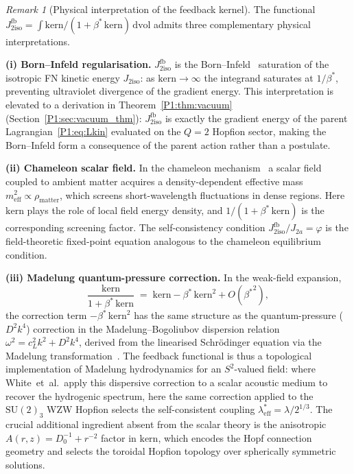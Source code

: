 \documentclass[11pt,a4paper]{article}
\theoremstyle{definition}
\theoremstyle{remark}
\newtheorem{remark}[theorem]{Remark}
\newcommand{\vp}{\varphi}
\newcommand{\lam}{\lambda}
\newcommand{\bst}{\beta^{*}}
\newcommand{\Jfb}{J_{2\mathrm{iso}}^{\mathrm{fb}}}
\newcommand{\Ja}{J_{2a}}
\newcommand{\Jiso}{J_{2\mathrm{iso}}}
\newcommand{\leff}{\lambda_{\mathrm{eff}}}
\begin{document}
\begin{remark}[Physical interpretation of the feedback kernel]
\label{P1:rem:chameleon}
The functional $\Jfb = \int \mathrm{kern}/(1+\bst\,\mathrm{kern})\,\mathrm{dvol}$
admits three complementary physical interpretations.

\textbf{(i) Born--Infeld regularisation.}
$\Jfb$ is the Born--Infeld~\cite{BornInfeld1934} saturation of the isotropic FN kinetic
energy $\Jiso$: as $\mathrm{kern}\to\infty$ the integrand saturates at
$1/\bst$, preventing ultraviolet divergence of the gradient energy.
This interpretation is elevated to a derivation in
Theorem~\ref{P1:thm:vacuum} (Section~\ref{P1:sec:vacuum_thm}): $\Jfb$ is
exactly the gradient energy of the parent Lagrangian~\eqref{P1:eq:Lkin}
evaluated on the $Q=2$ Hopfion sector, making the Born--Infeld form
a consequence of the parent action rather than a postulate.

\textbf{(ii) Chameleon scalar field.}
In the chameleon mechanism~\cite{KhouryWeltman2004} a scalar field
coupled to ambient matter acquires a density-dependent effective mass
$m_{\mathrm{eff}}^2 \propto \rho_{\mathrm{matter}}$, which screens
short-wavelength fluctuations in dense regions.  Here
$\mathrm{kern}$ plays the role of local field energy density, and
$1/(1+\bst\,\mathrm{kern})$ is the corresponding screening factor.
The self-consistency condition $\Jfb/\Ja = \vp$ is the field-theoretic
fixed-point equation analogous to the chameleon equilibrium condition.

\textbf{(iii) Madelung quantum-pressure correction.}
In the weak-field expansion,
\begin{equation}
  \frac{\mathrm{kern}}{1+\bst\,\mathrm{kern}}
  \;=\; \mathrm{kern} - \bst\,\mathrm{kern}^2 + O({\bst}^2),
  \label{P1:eq:weak_field_expansion}
\end{equation}
the correction term $-\bst\,\mathrm{kern}^2$ has the same structure
as the quantum-pressure ($D^2k^4$) correction in the Madelung--Bogoliubov
dispersion relation $\omega^2 = c_L^2 k^2 + D^2 k^4$, derived from the
linearised Schr\"{o}dinger equation via the Madelung
transformation~\cite{Madelung1927,White2026}.
The feedback functional is thus a topological implementation of
Madelung hydrodynamics for an $S^2$-valued field: where
White~et~al.\ apply this dispersive correction to a scalar acoustic
medium to recover the hydrogenic spectrum, here the same correction
applied to the $\mathrm{SU}(2)_3$ WZW Hopfion selects the
self-consistent coupling $\leff^* = \lam/2^{1/3}$.
The crucial additional ingredient absent from the scalar theory is the
anisotropic $A(r,z) = D_0^{-1} + r^{-2}$ factor in $\mathrm{kern}$,
which encodes the Hopf connection geometry and selects the toroidal
Hopfion topology over spherically symmetric solutions.
\end{remark}
\end{document}
